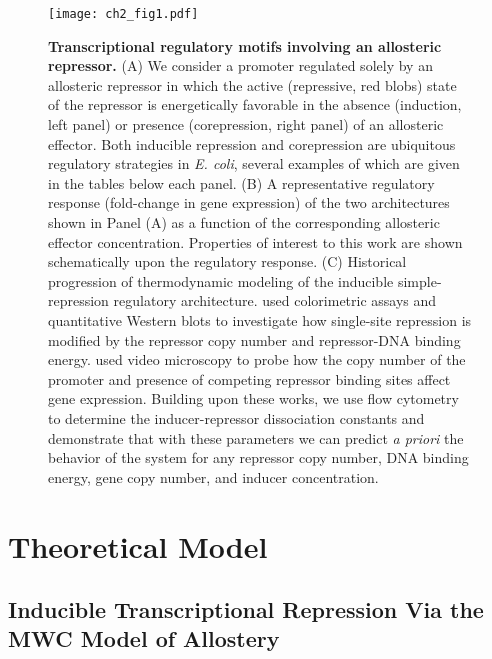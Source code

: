 \documentclass[12pt]{caltech_thesis}
\begin{document}
\hypertarget{fig:inducible_types}{%
\begin{figure}
\centering
\texttt{[image: ch2\_fig1.pdf]}
\caption[{Transcriptional regulatory architectures involving an
allosteric repressor.}]{\textbf{Transcriptional regulatory motifs
involving an allosteric repressor.} (A) We consider a promoter regulated
solely by an allosteric repressor in which the active (repressive, red
blobs) state of the repressor is energetically favorable in the absence
(induction, left panel) or presence (corepression, right panel) of an
allosteric effector. Both inducible repression and corepression are
ubiquitous regulatory strategies in \emph{E. coli}, several examples of
which are given in the tables below each panel. (B) A representative
regulatory response (fold-change in gene expression) of the two
architectures shown in Panel (A) as a function of the corresponding
allosteric effector concentration. Properties of interest to this work
are shown schematically upon the regulatory response. (C) Historical
progression of thermodynamic modeling of the inducible simple-repression
regulatory architecture. \textcite{garcia2011} used colorimetric assays
and quantitative Western blots to investigate how single-site repression
is modified by the repressor copy number and repressor-DNA binding
energy. \textcite{brewster2014} used video microscopy to probe how the
copy number of the promoter and presence of competing repressor binding
sites affect gene expression. Building upon these works, we use flow
cytometry to determine the inducer-repressor dissociation constants and
demonstrate that with these parameters we can predict \emph{a priori}
the behavior of the system for any repressor copy number, DNA binding
energy, gene copy number, and inducer concentration.}
\label{fig:inducible_types}
\end{figure}
}

\hypertarget{theoretical-model}{%
\section{Theoretical Model}\label{theoretical-model}}

\hypertarget{inducible-transcriptional-repression-via-the-mwc-model-of-allostery}{%
\subsection{Inducible Transcriptional Repression Via the MWC Model of
Allostery}\label{inducible-transcriptional-repression-via-the-mwc-model-of-allostery}}
\end{document}
